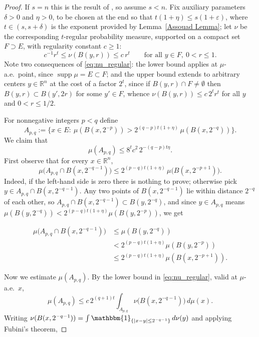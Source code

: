 \documentclass[12pt]{amsart}
\theoremstyle{definition}
\theoremstyle{remark}
\numberwithin{equation}{section}
\begin{document}
\begin{proof}
If $s=n$ this is the result of \cite{falconer1996packing}, so assume
$s<n$. Fix auxiliary parameters $\delta>0$ and $\eta>0$, to be chosen at
the end so that $t(1+\eta)\leq s(1+\varepsilon)$, where
$t\in(s,s+\delta)$ is the exponent provided by
Lemma~\ref{Assouad Lemma}; let $\nu$ be the corresponding $t$-regular
probability measure, supported on a compact set $F\supset E$, with
regularity constant $c\geq 1$:
\begin{equation}\label{eq:nu_regular}
c^{-1}r^{t}\leq \nu(B(y,r))\leq c\,r^{t}
\qquad\text{for all }y\in F,\ 0<r\leq 1.
\end{equation}
Note two consequences of \eqref{eq:nu_regular}: the lower bound applies
at $\mu$-a.e.\ point, since $\operatorname{supp}\mu=E\subset F$; and the
upper bound extends to arbitrary centers $y\in\mathbb{R}^n$ at the cost
of a factor $2^t$, since if $B(y,r)\cap F\neq\emptyset$ then
$B(y,r)\subset B(y',2r)$ for some $y'\in F$, whence
$\nu(B(y,r))\leq c\,2^{t}r^{t}$ for all $y$ and $0<r\leq 1/2$.

For nonnegative integers $p<q$ define
$$A_{p,q}:=\bigl\{x\in E:\ \mu(B(x,2^{-p}))>2^{(q-p)t(1+\eta)}\,\mu(B(x,2^{-q}))\bigr\}.$$
We claim that
\begin{equation}\label{eq:dyadic_bound}
\mu(A_{p,q})\leq 8^{t}c^{2}\,2^{-(q-p)t\eta}.
\end{equation}
First observe that for every $x\in\mathbb{R}^n$,
\begin{equation}\label{eq:local_bound}
\mu\bigl(A_{p,q}\cap B(x,2^{-q-1})\bigr)\leq
2^{(p-q)t(1+\eta)}\,\mu\bigl(B(x,2^{-p+1})\bigr).
\end{equation}
Indeed, if the left-hand side is zero there is nothing to prove;
otherwise pick $y\in A_{p,q}\cap B(x,2^{-q-1})$. Any two points of
$B(x,2^{-q-1})$ lie within distance $2^{-q}$ of each other, so
$A_{p,q}\cap B(x,2^{-q-1})\subset B(y,2^{-q})$, and since $y\in A_{p,q}$
means $\mu(B(y,2^{-q}))<2^{(p-q)t(1+\eta)}\mu(B(y,2^{-p}))$, we get

\begin{align*}
    \mu\bigl(A_{p,q}\cap B(x,2^{-q-1})\bigr)&\leq\mu(B(y,2^{-q}))\\
    &<2^{(p-q)t(1+\eta)}\mu(B(y,2^{-p}))\\
    &\leq 2^{(p-q)t(1+\eta)}\mu(B(x,2^{-p+1})).
\end{align*}


Now we estimate $\mu(A_{p,q})$. By the lower bound in
\eqref{eq:nu_regular}, valid at $\mu$-a.e.\ $x$,
$$\mu(A_{p,q})\leq c\,2^{(q+1)t}\int_{A_{p,q}}\nu\bigl(B(x,2^{-q-1})\bigr)\,d\mu(x).$$
Writing $\nu(B(x,2^{-q-1}))=\int\mathbbm{1}_{\{|x-y|\leq 2^{-q-1}\}}\,d\nu(y)$
and applying Fubini's theorem,


\end{proof}
\end{document}
